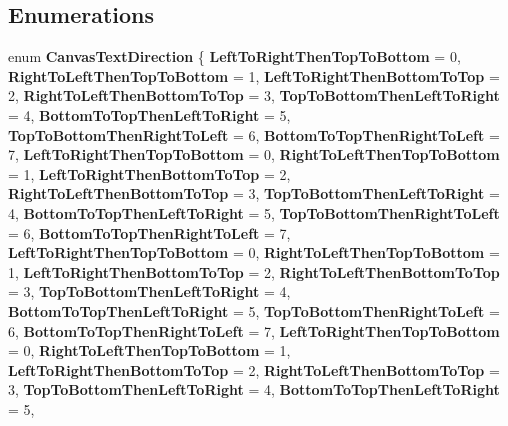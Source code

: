 \subsection*{Enumerations}
\begin{DoxyCompactItemize}
\item 
\mbox{\label{namespace_microsoft_1_1_graphics_1_1_canvas_1_1_text_a1e2efbc072261f0f4a89ae31e85b3d2a}} 
enum {\bfseries Canvas\+Text\+Direction} \{ \newline
{\bfseries Left\+To\+Right\+Then\+Top\+To\+Bottom} = 0, 
{\bfseries Right\+To\+Left\+Then\+Top\+To\+Bottom} = 1, 
{\bfseries Left\+To\+Right\+Then\+Bottom\+To\+Top} = 2, 
{\bfseries Right\+To\+Left\+Then\+Bottom\+To\+Top} = 3, 
\newline
{\bfseries Top\+To\+Bottom\+Then\+Left\+To\+Right} = 4, 
{\bfseries Bottom\+To\+Top\+Then\+Left\+To\+Right} = 5, 
{\bfseries Top\+To\+Bottom\+Then\+Right\+To\+Left} = 6, 
{\bfseries Bottom\+To\+Top\+Then\+Right\+To\+Left} = 7, 
\newline
{\bfseries Left\+To\+Right\+Then\+Top\+To\+Bottom} = 0, 
{\bfseries Right\+To\+Left\+Then\+Top\+To\+Bottom} = 1, 
{\bfseries Left\+To\+Right\+Then\+Bottom\+To\+Top} = 2, 
{\bfseries Right\+To\+Left\+Then\+Bottom\+To\+Top} = 3, 
\newline
{\bfseries Top\+To\+Bottom\+Then\+Left\+To\+Right} = 4, 
{\bfseries Bottom\+To\+Top\+Then\+Left\+To\+Right} = 5, 
{\bfseries Top\+To\+Bottom\+Then\+Right\+To\+Left} = 6, 
{\bfseries Bottom\+To\+Top\+Then\+Right\+To\+Left} = 7, 
\newline
{\bfseries Left\+To\+Right\+Then\+Top\+To\+Bottom} = 0, 
{\bfseries Right\+To\+Left\+Then\+Top\+To\+Bottom} = 1, 
{\bfseries Left\+To\+Right\+Then\+Bottom\+To\+Top} = 2, 
{\bfseries Right\+To\+Left\+Then\+Bottom\+To\+Top} = 3, 
\newline
{\bfseries Top\+To\+Bottom\+Then\+Left\+To\+Right} = 4, 
{\bfseries Bottom\+To\+Top\+Then\+Left\+To\+Right} = 5, 
{\bfseries Top\+To\+Bottom\+Then\+Right\+To\+Left} = 6, 
{\bfseries Bottom\+To\+Top\+Then\+Right\+To\+Left} = 7, 
\newline
{\bfseries Left\+To\+Right\+Then\+Top\+To\+Bottom} = 0, 
{\bfseries Right\+To\+Left\+Then\+Top\+To\+Bottom} = 1, 
{\bfseries Left\+To\+Right\+Then\+Bottom\+To\+Top} = 2, 
{\bfseries Right\+To\+Left\+Then\+Bottom\+To\+Top} = 3, 
\newline
{\bfseries Top\+To\+Bottom\+Then\+Left\+To\+Right} = 4, 
{\bfseries Bottom\+To\+Top\+Then\+Left\+To\+Right} = 5, 

\end{DoxyCompactItemize}
